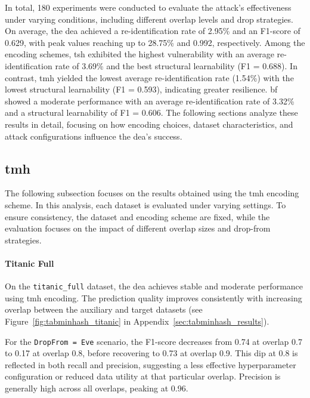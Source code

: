 In total, 180 experiments were conducted to evaluate the attack's effectiveness under varying conditions, including different overlap levels and drop strategies.
On average, the \ac{dea} achieved a re-identification rate of 2.95\% and an F1-score of 0.629, with peak values reaching up to 28.75\% and 0.992, respectively.
Among the encoding schemes, \ac{tsh} exhibited the highest vulnerability with an average re-identification rate of 3.69\% and the best structural learnability (F1 = 0.688).
In contrast, \ac{tmh} yielded the lowest average re-identification rate (1.54\%) with the lowest structural learnability (F1 = 0.593), indicating greater resilience.
\ac{bf} showed a moderate performance with an average re-identification rate of 3.32\% and a structural learnability of F1 = 0.606.
The following sections analyze these results in detail, focusing on how encoding choices, dataset characteristics, and attack configurations influence the \ac{dea}'s success.


\subsection{\ac{tmh}}

The following subsection focuses on the results obtained using the \ac{tmh} encoding scheme.
In this analysis, each dataset is evaluated under varying settings.
To ensure consistency, the dataset and encoding scheme are fixed, while the evaluation focuses on the impact of different overlap sizes and drop-from strategies.

\paragraph{Titanic Full}

On the \texttt{titanic\_full} dataset, the \ac{dea} achieves stable and moderate performance using \ac{tmh} encoding.
The prediction quality improves consistently with increasing overlap between the auxiliary and target datasets (see Figure~\ref{fig:tabminhash_titanic} in Appendix~\ref{sec:tabminhash_results}).

For the \texttt{DropFrom = Eve} scenario, the F1-score decreases from 0.74 at overlap 0.7 to 0.17 at overlap 0.8, before recovering to 0.73 at overlap 0.9.
This dip at 0.8 is reflected in both recall and precision, suggesting a less effective hyperparameter configuration or reduced data utility at that particular overlap.
Precision is generally high across all overlaps, peaking at 0.96.

